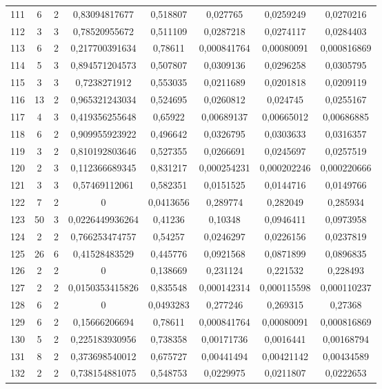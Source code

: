 \begin{longtable}{|c|c|c|c|c|c|c|c|}
111 & 6 & 2 & 0,83094817677 & 0,518807 & 0,027765 & 0,0259249 & 0,0270216  \\
112 & 3 & 3 & 0,78520955672 & 0,511109 & 0,0287218 & 0,0274117 & 0,0284403  \\
113 & 6 & 2 & 0,217700391634 & 0,78611 & 0,000841764 & 0,00080091 & 0,000816869  \\
114 & 5 & 3 & 0,894571204573 & 0,507807 & 0,0309136 & 0,0296258 & 0,0305795  \\
115 & 3 & 3 & 0,7238271912 & 0,553035 & 0,0211689 & 0,0201818 & 0,0209119  \\
116 & 13 & 2 & 0,965321243034 & 0,524695 & 0,0260812 & 0,024745 & 0,0255167  \\
117 & 4 & 3 & 0,419356255648 & 0,65922 & 0,00689137 & 0,00665012 & 0,00686885  \\
118 & 6 & 2 & 0,909955923922 & 0,496642 & 0,0326795 & 0,0303633 & 0,0316357  \\
119 & 3 & 2 & 0,810192803646 & 0,527355 & 0,0266691 & 0,0245697 & 0,0257519  \\
120 & 2 & 3 & 0,112366689345 & 0,831217 & 0,000254231 & 0,000202246 & 0,000220666  \\
121 & 3 & 3 & 0,57469112061 & 0,582351 & 0,0151525 & 0,0144716 & 0,0149766  \\
122 & 7 & 2 & 0 & 0,0413656 & 0,289774 & 0,282049 & 0,285934  \\
123 & 50 & 3 & 0,0226449936264 & 0,41236 & 0,10348 & 0,0946411 & 0,0973958  \\
124 & 2 & 2 & 0,766253474757 & 0,54257 & 0,0246297 & 0,0226156 & 0,0237819  \\
125 & 26 & 6 & 0,41528483529 & 0,445776 & 0,0921568 & 0,0871899 & 0,0896835  \\
126 & 2 & 2 & 0 & 0,138669 & 0,231124 & 0,221532 & 0,228493  \\
127 & 2 & 2 & 0,0150353415826 & 0,835548 & 0,000142314 & 0,000115598 & 0,000110237  \\
128 & 6 & 2 & 0 & 0,0493283 & 0,277246 & 0,269315 & 0,27368  \\
129 & 6 & 2 & 0,15666206694 & 0,78611 & 0,000841764 & 0,00080091 & 0,000816869  \\
130 & 5 & 2 & 0,225183930956 & 0,738358 & 0,00171736 & 0,0016441 & 0,00168794  \\
131 & 8 & 2 & 0,373698540012 & 0,675727 & 0,00441494 & 0,00421142 & 0,00434589  \\
132 & 2 & 2 & 0,738154881075 & 0,548753 & 0,0229975 & 0,0211807 & 0,0222653  \\

\end{longtable}
